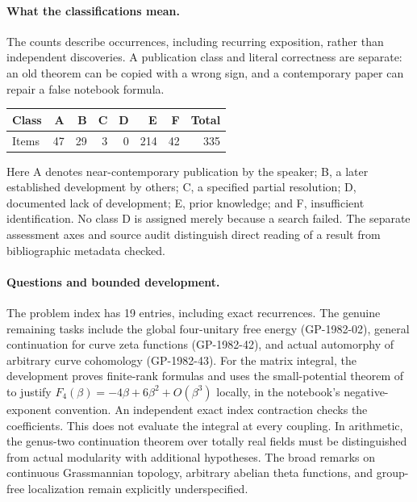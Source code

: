 \paragraph{What the classifications mean.}
The counts describe occurrences, including recurring exposition, rather than
independent discoveries. A publication class and literal correctness are
separate: an old theorem can be copied with a wrong sign, and a contemporary
paper can repair a false notebook formula.
\begin{center}
\begin{tabular}{@{}lrrrrrrr@{}}
\toprule
Class & A & B & C & D & E & F & Total\\
\midrule
Items & 47 & 29 & 3 & 0 & 214 & 42 & 335\\
\bottomrule
\end{tabular}
\end{center}
Here A denotes near-contemporary publication by the speaker; B, a later
established development by others; C, a specified partial resolution; D,
documented lack of development; E, prior knowledge; and F, insufficient
identification. No class D is assigned merely because a search failed.
The separate assessment axes and source audit distinguish direct reading
of a result from bibliographic metadata checked.

\paragraph{Questions and bounded development.}
The problem index has 19 entries, including exact recurrences.
The genuine remaining tasks include the global four-unitary free energy
(GP-1982-02), general continuation for curve zeta functions (GP-1982-42), and
actual automorphy of arbitrary curve cohomology (GP-1982-43).
For the matrix integral, the development proves finite-rank formulas and
uses the small-potential theorem of
\citet[Theorem~0.1]{collinsguionnetmaurel2009asymptotics} to justify
\(F_4(\beta)=-4\beta+6\beta^2+O(\beta^3)\) locally, in the notebook's
negative-exponent convention. An independent exact index contraction checks
the coefficients. This does not evaluate the integral at every coupling.
In arithmetic, the genus-two continuation theorem over totally real fields
\citep[Theorems~1.1.2--1.1.3]{boxercalegarigeepilloni2021surfaces}
must be distinguished from actual modularity with additional hypotheses.
The broad remarks on continuous Grassmannian topology, arbitrary abelian
theta functions, and group-free localization remain explicitly underspecified.


